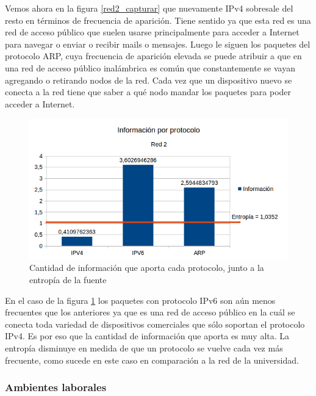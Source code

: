 Vemos ahora en la figura \ref{red2_capturar} que nuevamente IPv4 sobresale del resto en términos de frecuencia de aparición. Tiene sentido ya que esta red es una red de acceso público que suelen usarse principalmente para acceder a Internet para navegar o enviar o recibir mails o mensajes. Luego le siguen los paquetes del protocolo ARP, cuya frecuencia de aparición elevada se puede atribuir a que en una red de acceso público inalámbrica es común que constantemente se vayan agregando o retirando nodos de la red. Cada vez que un dispositivo nuevo se conecta a la red tiene que saber a qué nodo mandar los paquetes para poder acceder a Internet.

\begin{figure}[H]
	\centering
	\includegraphics[scale=0.65]{imgs/red2_capturar_entropia.png}
	\caption{Cantidad de información que aporta cada protocolo, junto a la entropía de la fuente}
      \label{red2_capturar_entropia}
\end{figure}

En el caso de la figura \ref{red2_capturar_entropia} los paquetes con protocolo IPv6 son aún menos frecuentes que los anteriores ya que es una red de acceso público en la cuál se conecta toda variedad de dispositivos comerciales que sólo soportan el protocolo IPv4. Es por eso que la cantidad de información que aporta es muy alta. La entropía disminuye en medida de que un protocolo se vuelve cada vez más frecuente, como sucede en este caso en comparación a la red de la universidad.

\subsubsection{Ambientes laborales}

